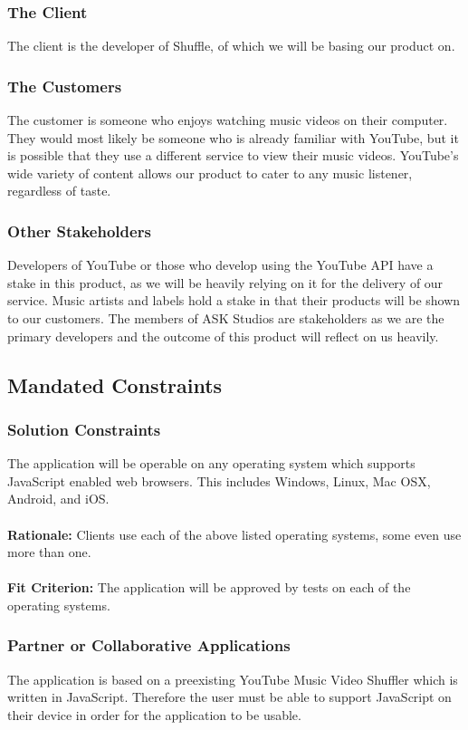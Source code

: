 \documentclass[12pt, titlepage]{article}
\begin{document}
\subsubsection{The Client}
The client is the developer of Shuffle, of which we will be basing our product on.
\subsubsection{The Customers}
The customer is someone who enjoys watching music videos on their computer.  They would most likely be someone who is already familiar with YouTube, but it is possible that they use a different service to view their music videos.  YouTube's wide variety of content allows our product to cater to any music listener, regardless of taste.
\subsubsection{Other Stakeholders}
Developers of YouTube or those who develop using the YouTube API have a stake in this product, as we will be heavily relying on it for the delivery of our service.  Music artists and labels hold a stake in that their products will be shown to our customers.  The members of ASK Studios are stakeholders as we are the primary developers and the outcome of this product will reflect on us heavily.

\subsection{Mandated Constraints}
\subsubsection{Solution Constraints}
The application will be operable on any operating system which supports JavaScript enabled web browsers. This includes Windows, Linux, Mac OSX, Android, and iOS. \\
\\
\textbf{Rationale:} Clients use each of the above listed operating systems, some even use more than one. \\\\
\textbf{Fit Criterion:} The application will be approved by tests on each of the operating systems.
\subsubsection{Partner or Collaborative Applications}
The application is based on a preexisting YouTube Music Video Shuffler which is written in JavaScript. Therefore the user must be able to support JavaScript on their device in order for the application to be usable.
\end{document}
